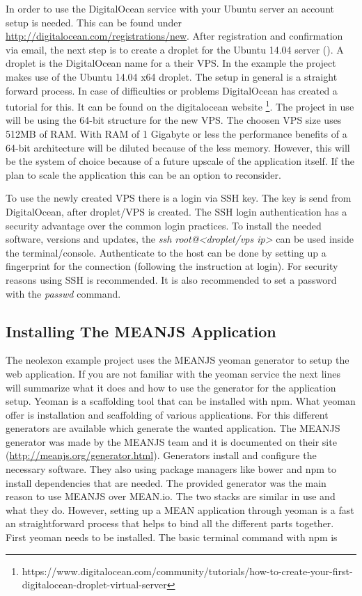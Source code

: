 In order to use the DigitalOcean service with your Ubuntu server an account setup is needed. This can be found under \url{http://digitalocean.com/registrations/new}. After
registration and confirmation via email, the next step is to create a droplet for the Ubuntu 14.04 server (\cite{droplet}). A droplet is the DigitalOcean name for a their VPS.
In the example the project makes use of the Ubuntu 14.04 x64 droplet. The setup in general is a straight forward process. In case of difficulties or problems DigitalOcean has
created a tutorial for this. It can be found on the digitalocean website \footnote{https://www.digitalocean.com/community/tutorials/how-to-create-your-first-digitalocean-droplet-virtual-server}.
The project in use will be using the 64-bit structure for the new VPS. The choosen VPS size uses 512MB of RAM. With RAM of 1 Gigabyte or less the performance benefits of a 64-bit
architecture will be diluted because of the less memory. However, this will be the system of choice because of a future upscale of the application itself. If the plan
to scale the application this can be an option to reconsider.

To use the newly created VPS there is a login via SSH key. The key is send from DigitalOcean, after droplet/VPS is created. The SSH login authentication has a security
advantage over the common login practices. To install the needed software, versions and updates, the \textit{ssh root@<droplet/vps ip>} can be used inside the
terminal/console. Authenticate to the host can be done by setting up a fingerprint for the connection (following the instruction at login). For security reasons
using SSH is recommended. It is also recommended to set a password with the \textit{passwd} command.

\subsection{Installing The MEANJS Application}
The neolexon example project uses the MEANJS yeoman generator to setup the web application. If you are not familiar with the yeoman service the next lines
will summarize what it does and how to use the generator for the application setup. Yeoman is a scaffolding tool that can be installed with npm. What yeoman offer is
installation and scaffolding of various applications. For this different generators are available which generate the wanted application. The MEANJS generator
was made by the MEANJS team and it is documented on their site (\url{http://meanjs.org/generator.html}). Generators install and configure the necessary software.
They also using package managers like bower and npm to install dependencies that are needed. The provided generator was the main reason to use MEANJS over MEAN.io.
The two stacks are similar in use and what they do. However, setting up a MEAN application through yeoman is a fast an straightforward process that helps to bind all
the different parts together. First yeoman needs to be installed. The basic terminal command with npm is


